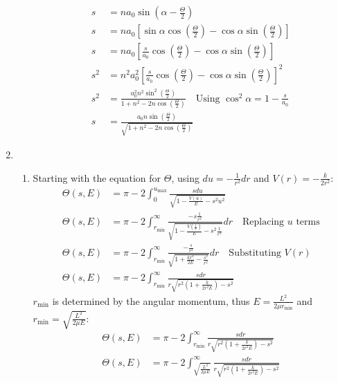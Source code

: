 \documentclass[12pt]{article}
\begin{document}
\begin{enumerate}
\begin{enumerate}
\begin{align*}
                s&=na_0\sin\left(\alpha-\frac{\Theta}{2}\right)\\
                s&=na_0\left[\sin\alpha\cos\left(\frac{\Theta}{2}\right)-\cos\alpha\sin\left(\frac{\Theta}{2}\right)\right]\\
                s&=na_0\left[\frac{s}{a_0}\cos\left(\frac{\Theta}{2}\right)-\cos\alpha\sin\left(\frac{\Theta}{2}\right)\right]\\
                s^2&=n^2 a_0^2\left[\frac{s}{a_0}\cos\left(\frac{\Theta}{2}\right)-\cos\alpha\sin\left(\frac{\Theta}{2}\right)\right]^2\\
                s^2&=\frac{a_0^2 n^2\sin^2\left( \frac{\Theta}{2} \right)}{1+n^2-2n\cos\left( \frac{\Theta}{2} \right)}\quad\text{Using }\cos^2\alpha=1-\frac{s}{a_0}\\
                s&=\frac{a_0 n\sin\left( \frac{\Theta}{2} \right)}{\sqrt{1+n^2-2n\cos\left( \frac{\Theta}{2} \right)}}
            \end{align*}
        \end{enumerate}
        \item
        \begin{enumerate}
            \item Starting with the equation for $\Theta$, using $du=-\frac{1}{r^2}dr$ and $V(r)=-\frac{k}{2r^2}$:
            \begin{align*}
                \Theta(s,E)&=\pi-2\int_0^{u_{\max}}\frac{sdu}{\sqrt{1-\frac{V(u)}{E}-s^2 u^2}}\\
                \Theta(s,E)&=\pi-2\int_{r_{\min}}^{\infty}\frac{-s\frac{1}{r^2}}{\sqrt{1-\frac{V(\frac{1}{r})}{E}-s^2\frac{1}{r^2}}}dr\quad\text{Replacing $u$ terms}\\
                \Theta(s,E)&=\pi-2\int_{r_{\min}}^{\infty}\frac{-\frac{s}{r^2}}{\sqrt{1+\frac{kr^2}{2E}-\frac{s^2}{r^2}}}dr\quad\text{Substituting $V(r)$}\\
                \Theta(s,E)&=\pi-2\int_{r_{\min}}^{\infty}\frac{sdr}{r\sqrt{r^2\left(1+\frac{k}{2r^2 E}\right)-s^2}}
            \end{align*}
            $r_{\min}$ is determined by the angular momentum, thus $E=\frac{L^2}{2\mu r_{\min}}$ and $r_{\min}=\sqrt{\frac{L^2}{2\mu E}}$:
            \begin{align*}
                \Theta(s,E)&=\pi-2\int_{r_{\min}}^{\infty}\frac{sdr}{r\sqrt{r^2\left(1+\frac{k}{2r^2 E}\right)-s^2}}\\
                \Theta(s,E)&=\pi-2\int_{\sqrt{\frac{L^2}{2\mu E}}}^{\infty}\frac{sdr}{r\sqrt{r^2\left(1+\frac{k}{2r^2 E}\right)-s^2}}\\

\end{align*}
\end{enumerate}
\end{enumerate}
\end{document}
